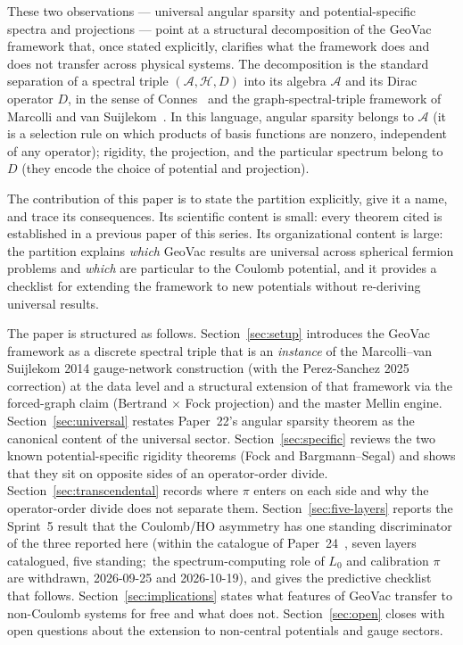 \documentclass[twocolumn,pra,amsmath,amssymb,superscriptaddress]{revtex4-2}
\begin{document}
These two observations --- universal angular sparsity and
potential-specific spectra and projections --- point at a structural
decomposition of the GeoVac framework that, once stated explicitly,
clarifies what the framework does and does not transfer across
physical systems.  The decomposition is the standard separation of a
spectral triple $(\mathcal{A}, \mathcal{H}, D)$ into its algebra
$\mathcal{A}$ and its Dirac operator $D$, in the sense of
Connes~\cite{connes_book1994} and the graph-spectral-triple framework
of Marcolli and van Suijlekom~\cite{marcolli_vs2014}.  In this
language, angular sparsity belongs to $\mathcal{A}$ (it is a
selection rule on which products of basis functions are nonzero,
independent of any operator); rigidity, the projection, and the
particular spectrum belong to $D$ (they encode the choice of
potential and projection).

The contribution of this paper is to state the partition explicitly,
give it a name, and trace its consequences.  Its scientific content
is small: every theorem cited is established in a previous paper of
this series.  Its organizational content is large: the partition
explains \emph{which} GeoVac results are universal across spherical
fermion problems and \emph{which} are particular to the Coulomb
potential, and it provides a checklist for extending the framework
to new potentials without re-deriving universal results.

The paper is structured as follows.
Section~\ref{sec:setup} introduces the GeoVac framework as a discrete
spectral triple that is an \emph{instance} of the Marcolli--van
Suijlekom 2014 gauge-network construction (with the Perez-Sanchez
2025 correction) at the data level and a structural extension of
that framework via the forced-graph claim (Bertrand $\times$ Fock
projection) and the master Mellin engine.
Section~\ref{sec:universal} restates Paper~22's angular sparsity
theorem as the canonical content of the universal sector.
Section~\ref{sec:specific} reviews the two known potential-specific
rigidity theorems (Fock and Bargmann--Segal) and shows that they sit
on opposite sides of an operator-order divide.
Section~\ref{sec:transcendental} records where $\pi$ enters on each
side and why the operator-order divide does not separate them.
Section~\ref{sec:five-layers} reports the Sprint~5 result that the
Coulomb/HO asymmetry has one standing discriminator of the three
reported here (within the catalogue of Paper~24~\cite{paper24}, seven
layers catalogued, five standing;\ the spectrum-computing role of
$L_0$ and calibration $\pi$ are withdrawn, 2026-09-25 and
2026-10-19), and gives
the predictive checklist that follows.
Section~\ref{sec:implications} states what features of GeoVac
transfer to non-Coulomb systems for free and what does not.
Section~\ref{sec:open} closes with open questions about the
extension to non-central potentials and gauge sectors.
\end{document}
